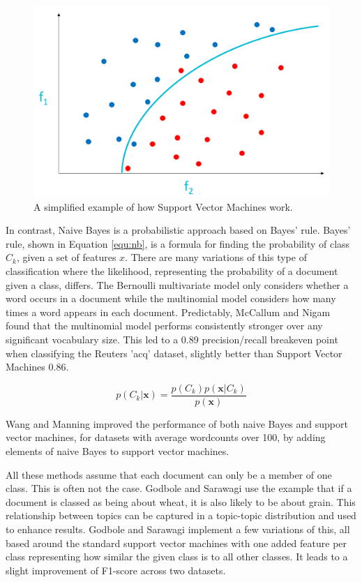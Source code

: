		\begin{figure}[h]
    		\centering
    		\includegraphics[width=0.5\linewidth]{resources/images/svm_simple.png}
    		\caption{A simplified example of how Support Vector Machines work.}
    		\label{fig:svm_simple}
		\end{figure} 

			In contrast, Naive Bayes is a probabilistic approach based on Bayes' rule. Bayes' rule, shown in Equation \ref{equ:nb}, is a formula for finding the probability of class $C_k$, given a set of features $x$. There are many variations of this type of classification where the likelihood, representing the probability of a document given a class, diﬀers. The Bernoulli multivariate model only considers whether a word occurs in a document while the multinomial model considers how many times a word appears in each document. Predictably, McCallum and Nigam found that the multinomial model performs consistently stronger over any significant vocabulary size. This led to a 0.89 precision/recall breakeven point when classifying the Reuters 'acq' dataset, slightly better than Support Vector Machines 0.86.  

			\begin{equation}\label{equ:nb}
				p(C_k|\textbf{x}) = \frac{p(C_k)p(\textbf{x}|C_k)}{p(\textbf{x})}
			\end{equation}

			Wang and Manning improved the performance of both naive Bayes and support vector machines, for datasets with average wordcounts over 100, by adding elements of naive Bayes to support vector machines\cite{baselines_bigrams_wang}.  

			All these methods assume that each document can only be a member of one class. This is often not the case. Godbole and Sarawagi use the example that if a document is classed as being about wheat, it is also likely to be about grain\cite{discriminative_multilabel_godbole}. This relationship between topics can be captured in a topic-topic distribution and used to enhance results. Godbole and Sarawagi implement a few variations of this, all based around the standard support vector machines with one added feature per class representing how similar the given class is to all other classes. It leads to a slight improvement of F1-score across two datasets.
			

